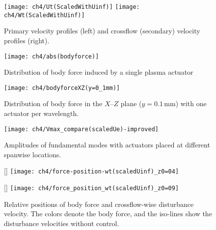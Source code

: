 \begin{figure}
\centering
  \texttt{[image: ch4/Ut(ScaledWithUinf)]} \texttt{[image: ch4/Wt(ScaledWithUinf)]}
  \caption{Primary velocity profiles (left) and  crossflow (secondary) velocity profiles (right).}%
  \label{f:BLvelocityprofile}
\end{figure}

\begin{figure}
\centering
  \texttt{[image: ch4/abs(bodyforce)]}
  \caption{Distribution of  body force induced by a single plasma actuator}%
  \label{f:forceshape}
\end{figure}

\begin{figure}
\centering
  \texttt{[image: ch4/bodyforceXZ(y=0\_1mm)]}
  \caption{Distribution of  body force in the $X$--$Z$ plane ($y= 0.1$\,mm) with one actuator per wavelength.}%
  \label{f:force_XZ_1perwavelength}
\end{figure}

\begin{figure}
\centering
  \texttt{[image: ch4/Vmax\_compare(scaledUe)-improved]}
  \caption{Amplitudes of  fundamental modes with actuators placed at different spanwise locations.}%
  \label{f:bestworst}
\end{figure}

\begin{figure}
\centering
  [\textwidth]
  {\texttt{[image: ch4/force-position-wt(scaledUinf)\_z0=04]}
}


  [\textwidth]
  {
  \texttt{[image: ch4/force\_position\_wt(scaledUinf)\_z0=09]}
  }
  \caption{Relative positions of body force and crossflow-wise disturbance velocity. The colors denote the body force, and the iso-lines show the disturbance velocities without control.}
  \label{f:pla_postion}

\end{figure}


